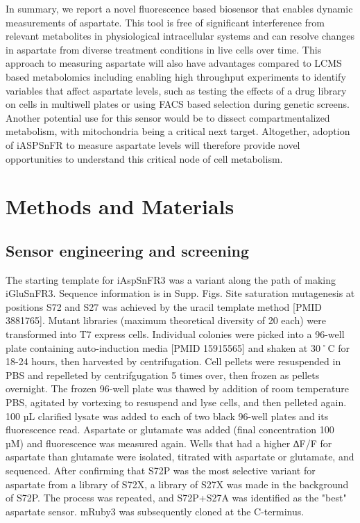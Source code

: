 \documentclass[9pt,lineno]{elife}
\begin{document}
In summary, we report a novel fluorescence based biosensor that enables dynamic measurements of aspartate.
This tool is free of significant interference from relevant metabolites in physiological intracellular systems and can resolve changes in aspartate from diverse treatment conditions in live cells over time.
This approach to measuring aspartate will also have advantages compared to LCMS based metabolomics including enabling high throughput experiments to identify variables that affect aspartate levels, such as testing the effects of a drug library on cells in multiwell plates or using FACS based selection during genetic screens.
Another potential use for this sensor would be to dissect compartmentalized metabolism, with mitochondria being a critical next target.
Altogether, adoption of iASPSnFR to measure aspartate levels will therefore provide novel opportunities to understand this critical node of cell metabolism.



\section{Methods and Materials}

\subsection{Sensor engineering and screening}
The starting template for iAspSnFR3 was a variant along the path of making iGluSnFR3.
Sequence information is in Supp. Figs.
Site saturation mutagenesis at positions S72 and S27 was achieved by the uracil template method [PMID 3881765].
Mutant libraries (maximum theoretical diversity of 20 each) were transformed into T7 express cells.
Individual colonies were picked into a 96-well plate containing auto-induction media [PMID 15915565] and shaken at 30˚C for 18-24 hours, then harvested by centrifugation.
Cell pellets were resuspended in PBS and repelleted by centrifgugation 5 times over, then frozen as pellets overnight.
The frozen 96-well plate was thawed by addition of room temperature PBS, agitated by vortexing to resuspend and lyse cells, and then pelleted again.
100 µL clarified lysate was added to each of two black 96-well plates and its fluorescence read.
Aspartate or glutamate was added (final concentration 100 µM) and fluorescence was measured again.
Wells that had a higher ∆F/F for aspartate than glutamate were isolated, titrated with aspartate or glutamate, and sequenced.
After confirming that S72P was the most selective variant for aspartate from a library of S72X, a library of S27X was made in the background of S72P.
The process was repeated, and S72P+S27A was identified as the "best" aspartate sensor.
mRuby3 was subsequently cloned at the C-terminus.
\end{document}
